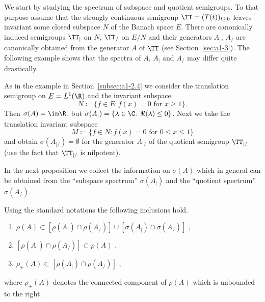 We start by studying the spectrum of subspace and quotient semigroups.
To that purpose assume that the strongly continuous semigroup $\TT = (T(t))_{t \geq 0}$ leaves invariant some closed subspace $N$ of the Banach space $E$.
There are canonically induced semigroups $\TT_{|}$ on $N$, \resp $\TT_{/}$ on $E/N$ and their generators $A_{|}$, \resp $A_{/}$ are canonically obtained from the generator $A$ of\/ $\TT$ (see Section~\ref{sec:a1-3}).
The following example shows that the spectra of\/ $A$, $A_{|}$ and $A_{/}$ may differ quite drastically.
\begin{example}\label{ex:a3-4.1}
As in the example in Section~\ref{subsec:a1-2.4} we consider the translation semigroup on $E = L^{1}(\R)$ and the 
invariant subspace 
%
\[
	N \coloneqq \{f \in E \colon f(x) = 0 \text{ for } x \geq 1\} .
\]
%
Then $\sigma(A) = \im\R$, but $\sigma(A_{|}) = \{\lambda \in \C \colon \Re(\lambda) \leq 0\}$.
Next we take the translation invariant subspace 
%
\[
	M \coloneqq \{f \in N \colon f(x) = 0 \text{ for } 0 \leq x \leq 1\}
\]
%
and obtain $\sigma(A_{|/}) = \emptyset$ for the generator $A_{|/}$ of the quotient semigroup $\TT_{|/}$ (use the fact that $\TT_{|/}$ is nilpotent).
\end{example}
In the next proposition we collect the information on $\sigma(A)$ which in general can be obtained from the \enquote{subspace spectrum} $\sigma(A_{|})$ and the \enquote{quotient spectrum} $\sigma(A_{/})$.
\begin{proposition}\label{prop:a3-4.2}
Using the standard notations the following inclusions hold.
\begin{enumerate}[\upshape (i)]
\item 
$\rho(A) \subset [\rho(A_{|}) \cap \rho(A_{/})] \cup [\sigma(A_{|}) \cap \sigma(A_{/})]$ ,

\item 
$[\rho(A_{|}) \cap \rho(A_{/})] \subset \rho(A) $ ,

\item 
$\rho_{+}(A) \subset [\rho(A_{|}) \cap \rho(A_{/})]$ ,
\end{enumerate}
 where $\rho_{+}(A)$ denotes the connected component of\/ $\rho(A)$ which is unbounded to the right.

\end{proposition}

